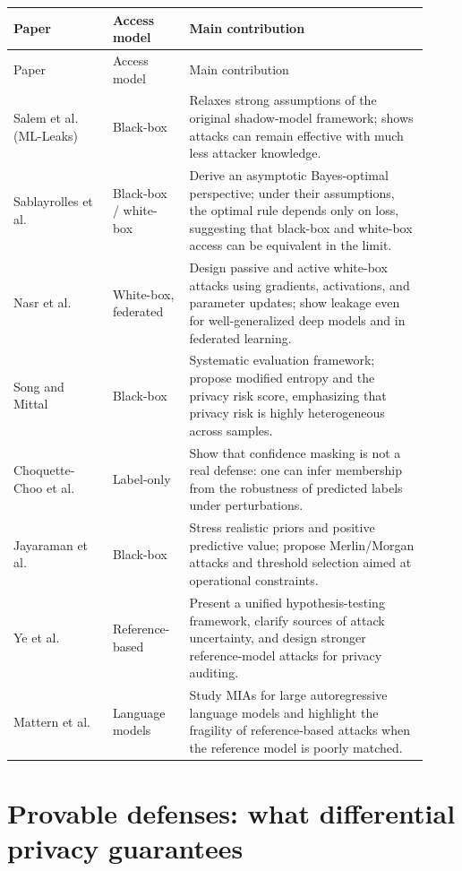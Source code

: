 \documentclass[11pt]{article}
\theoremstyle{definition}
\newcommand{\1}{\mathbf{1}}
\begin{document}
\begin{center}
\small
\begin{longtable}{@{}p{0.22\linewidth}p{0.17\linewidth}p{0.53\linewidth}@{}}
\toprule
Paper & Access model & Main contribution \\
\midrule
\endfirsthead
\toprule
Paper & Access model & Main contribution \\
\midrule
\endhead
Salem et al. (ML-Leaks)~\cite{salem2019} & Black-box & Relaxes strong assumptions of the original shadow-model framework; shows attacks can remain effective with much less attacker knowledge. \\
Sablayrolles et al.~\cite{sablayrolles2019} & Black-box / white-box & Derive an asymptotic Bayes-optimal perspective; under their assumptions, the optimal rule depends only on loss, suggesting that black-box and white-box access can be equivalent in the limit. \\
Nasr et al.~\cite{nasr2019} & White-box, federated & Design passive and active white-box attacks using gradients, activations, and parameter updates; show leakage even for well-generalized deep models and in federated learning. \\
Song and Mittal~\cite{songmittal2021} & Black-box & Systematic evaluation framework; propose modified entropy and the privacy risk score, emphasizing that privacy risk is highly heterogeneous across samples. \\
Choquette-Choo et al.~\cite{choquette2021} & Label-only & Show that confidence masking is not a real defense: one can infer membership from the robustness of predicted labels under perturbations. \\
Jayaraman et al.~\cite{jayaraman2021} & Black-box & Stress realistic priors and positive predictive value; propose Merlin/Morgan attacks and threshold selection aimed at operational constraints. \\
Ye et al.~\cite{ye2022} & Reference-based & Present a unified hypothesis-testing framework, clarify sources of attack uncertainty, and design stronger reference-model attacks for privacy auditing. \\
Mattern et al.~\cite{mattern2023} & Language models & Study MIAs for large autoregressive language models and highlight the fragility of reference-based attacks when the reference model is poorly matched. \\
\bottomrule
\end{longtable}
\end{center}

\section{Provable defenses: what differential privacy guarantees}
\end{document}
